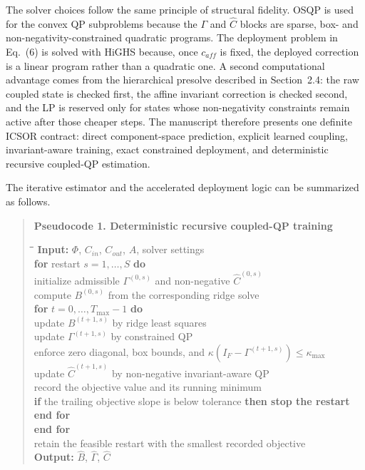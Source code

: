 \documentclass[11pt]{article}
\begin{document}
The solver choices follow the same principle of structural fidelity. OSQP is used for the convex QP subproblems because the $\Gamma$ and $\widehat{C}$ blocks are sparse, box- and non-negativity-constrained quadratic programs. The deployment problem in Eq.~(6) is solved with HiGHS because, once $c_{aff}$ is fixed, the deployed correction is a linear program rather than a quadratic one. A second computational advantage comes from the hierarchical presolve described in Section~2.4: the raw coupled state is checked first, the affine invariant correction is checked second, and the LP is reserved only for states whose non-negativity constraints remain active after those cheaper steps. The manuscript therefore presents one definite ICSOR contract: direct component-space prediction, explicit learned coupling, invariant-aware training, exact constrained deployment, and deterministic recursive coupled-QP estimation.

The iterative estimator and the accelerated deployment logic can be summarized as follows.

\begin{quote}
\noindent\textbf{Pseudocode 1. Deterministic recursive coupled-QP training}
\begin{tabbing}
\hspace{0.6cm}\=\hspace{0.6cm}\=\hspace{0.6cm}\=\kill
\textbf{Input:} $\Phi$, $C_{in}$, $C_{out}$, $A$, solver settings \\
\textbf{for} restart $s = 1, \dots, S$ \textbf{do} \\
\> initialize admissible $\Gamma^{(0,s)}$ and non-negative $\widehat{C}^{(0,s)}$ \\
\> compute $B^{(0,s)}$ from the corresponding ridge solve \\
\> \textbf{for} $t = 0, \dots, T_{\max}-1$ \textbf{do} \\
\>\> update $B^{(t+1,s)}$ by ridge least squares \\
\>\> update $\Gamma^{(t+1,s)}$ by constrained QP \\
\>\> enforce zero diagonal, box bounds, and $\kappa(I_F - \Gamma^{(t+1,s)}) \le \kappa_{\max}$ \\
\>\> update $\widehat{C}^{(t+1,s)}$ by non-negative invariant-aware QP \\
\>\> record the objective value and its running minimum \\
\>\> \textbf{if} the trailing objective slope is below tolerance \textbf{then stop the restart} \\
\> \textbf{end for} \\
\textbf{end for} \\
retain the feasible restart with the smallest recorded objective \\
\textbf{Output:} $\widehat{B}$, $\widehat{\Gamma}$, $\widehat{C}$
\end{tabbing}
\end{quote}
\end{document}
